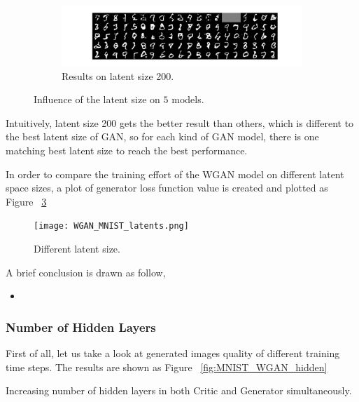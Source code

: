 \documentclass[12pt,letterpaper]{article}
\begin{document}
\begin{figure}[h]
    \medskip
    \begin{subfigure}{0.49\textwidth}
    \includegraphics[width=\linewidth]{WGAN_MNIST_0_200_256.png}
    \caption{\small Results on latent size 200.} \label{fig:c}
    \end{subfigure}\hspace*{\fill}
    \caption{Influence of the latent size on $5$ models.} \label{fig:MNIST_GAN_latent}
\end{figure}

Intuitively, latent size 200 gets the better result than others, which is different to the best latent size of GAN, so for each kind of GAN model, there is one matching best latent size to reach the best performance.

In order to compare the training effort of the WGAN model on different latent space sizes, a plot of generator loss function value is created and plotted as Figure ~\ref{fig:wgen_latent}
\begin{figure}[h]
    \centering
    \texttt{[image: WGAN\_MNIST\_latents.png]}
    \caption{\small Different latent size.}
    \label{fig:wgen_latent}
\end{figure}



A brief conclusion is drawn as follow,
\begin{itemize}
    \item 
\end{itemize}
 


\subsubsection{Number of Hidden Layers}

First of all, let us take a look at generated images quality of different training time steps. The results are shown as Figure ~\ref{fig:MNIST_WGAN_hidden}

Increasing number of hidden layers in both Critic and Generator simultaneously. 
\end{document}
